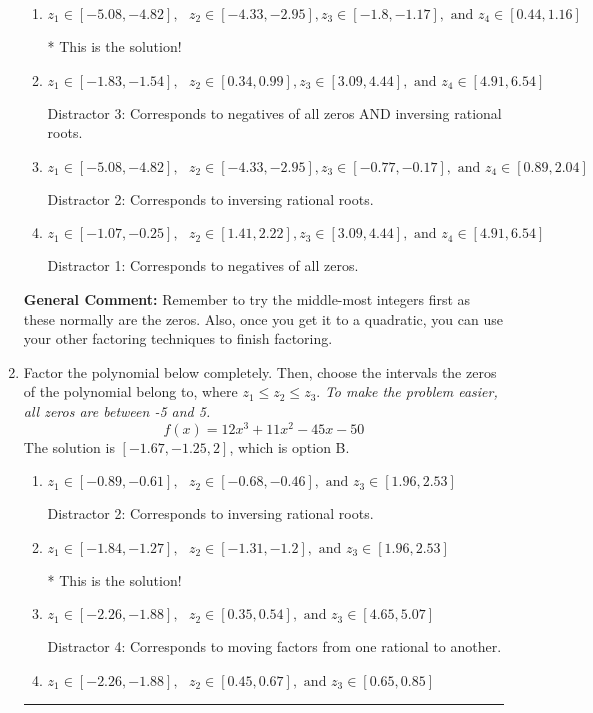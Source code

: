 \documentclass{extbook}[14pt]
\newcommand{\litem}[1]{\item #1

\rule{\textwidth}{0.4pt}}
\begin{document}
\begin{enumerate}
{\begin{enumerate}[label=\Alph*.]
 Distractor 4: Corresponds to moving factors from one rational to another.
\item \( z_1 \in [-5.08, -4.82], \text{   }  z_2 \in [-4.33, -2.95], z_3 \in [-1.8, -1.17], \text{   and   } z_4 \in [0.44, 1.16] \)

* This is the solution!
\item \( z_1 \in [-1.83, -1.54], \text{   }  z_2 \in [0.34, 0.99], z_3 \in [3.09, 4.44], \text{   and   } z_4 \in [4.91, 6.54] \)

 Distractor 3: Corresponds to negatives of all zeros AND inversing rational roots.
\item \( z_1 \in [-5.08, -4.82], \text{   }  z_2 \in [-4.33, -2.95], z_3 \in [-0.77, -0.17], \text{   and   } z_4 \in [0.89, 2.04] \)

 Distractor 2: Corresponds to inversing rational roots.
\item \( z_1 \in [-1.07, -0.25], \text{   }  z_2 \in [1.41, 2.22], z_3 \in [3.09, 4.44], \text{   and   } z_4 \in [4.91, 6.54] \)

 Distractor 1: Corresponds to negatives of all zeros.
\end{enumerate}

\textbf{General Comment:} Remember to try the middle-most integers first as these normally are the zeros. Also, once you get it to a quadratic, you can use your other factoring techniques to finish factoring.
}
\litem{
Factor the polynomial below completely. Then, choose the intervals the zeros of the polynomial belong to, where $z_1 \leq z_2 \leq z_3$. \textit{To make the problem easier, all zeros are between -5 and 5.}
\[ f(x) = 12x^{3} +11 x^{2} -45 x -50 \]The solution is \( [-1.67, -1.25, 2] \), which is option B.\begin{enumerate}[label=\Alph*.]
\item \( z_1 \in [-0.89, -0.61], \text{   }  z_2 \in [-0.68, -0.46], \text{   and   } z_3 \in [1.96, 2.53] \)

 Distractor 2: Corresponds to inversing rational roots.
\item \( z_1 \in [-1.84, -1.27], \text{   }  z_2 \in [-1.31, -1.2], \text{   and   } z_3 \in [1.96, 2.53] \)

* This is the solution!
\item \( z_1 \in [-2.26, -1.88], \text{   }  z_2 \in [0.35, 0.54], \text{   and   } z_3 \in [4.65, 5.07] \)

 Distractor 4: Corresponds to moving factors from one rational to another.
\item \( z_1 \in [-2.26, -1.88], \text{   }  z_2 \in [0.45, 0.67], \text{   and   } z_3 \in [0.65, 0.85] \)


\end{enumerate}}
\end{enumerate}
\end{document}
